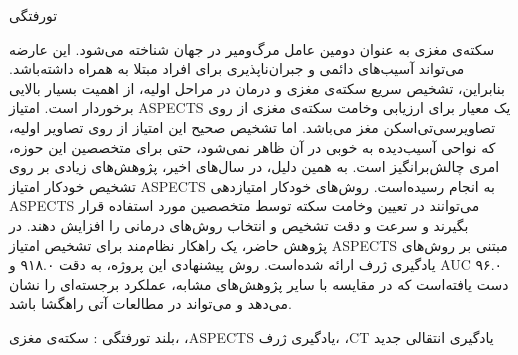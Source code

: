 


‌تورفتگی

سکته‌ی مغزی به عنوان دومین عامل مرگ‌و‌میر در جهان شناخته می‌شود.
این عارضه می‌تواند آسیب‌های دائمی و جبران‌ناپذیری برای افراد مبتلا به همراه داشته‌باشد.
بنابراین،
تشخیص سریع سکته‌ی مغزی و درمان در مراحل اولیه، از اهمیت بسیار بالایی برخوردار است.
امتیاز ASPECTS یک معیار برای ارزیابی وخامت سکته‌ی مغزی از روی تصاویرسی‌تی‌اسکن مغز می‌باشد.
اما تشخیص صحیح این امتیاز از روی تصاویر اولیه، که نواحی آسیب‌دیده به خوبی در آن ظاهر نمی‌شود، حتی برای متخصصین این حوزه، امری چالش‌بر‌انگیز است.
به همین دلیل، در سال‌های اخیر، پژوهش‌های زیادی بر روی تشخیص خودکار امتیاز ASPECTS به انجام رسیده‌است.
روش‌های خودکار امتیاز‌دهی ASPECTS می‌توانند
 در تعیین وخامت سکته توسط متخصصین مورد استفاده قرار بگیرند و سرعت و دقت تشخیص و انتخاب روش‌های درمانی را افزایش دهند.
 در پژوهش حاضر، 
 یک راهکار نظام‌مند برای تشخیص امتیاز ASPECTS مبتنی بر روش‌های یادگیری ژرف ارائه شد‌ه‌است.
 روش پیشنهادی این پروژه،
 به دقت ۹۱۸.۰ و AUC ۹۶.۰ دست یافته‌است که
 در مقایسه با سایر پژوهش‌های مشابه، عملکرد برجسته‌ای را نشان می‌دهد و
می‌تواند در مطالعات آتی راهگشا باشد.

‌بلند
‌تورفتگی : 
سکته‌ی مغزی، ،ASPECTS یادگیری ژرف، ،CT یادگیری انتقالی
‌جدید
